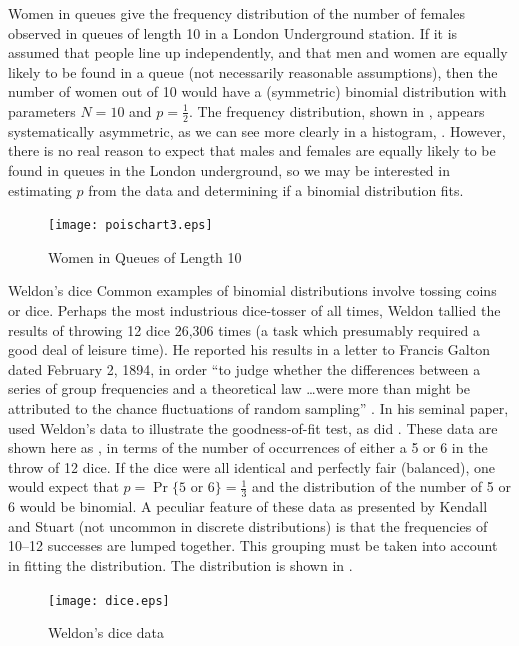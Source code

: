 \begin{Example}[queues]{Women in queues}
\citet{JinkinsonSlater:81,HoaglinTukey:85}
give the frequency distribution of the number of females observed in
queues of length 10 in a London Underground station.
If it is assumed that people line up independently, and that
men and women are equally likely to be found in a queue
(not necessarily reasonable assumptions),
then the number of women out of 10
would have a (symmetric) binomial distribution with parameters $N=10$ and
$p=\frac12$.
The frequency distribution, shown in ,
appears systematically asymmetric, as we can see more clearly in
a histogram, .
However, there is no real reason to expect that males and females are
equally likely to be found in queues in the London underground,
so we may be interested in estimating $p$ from the data
and determining if a binomial distribution fits.



\begin{figure}[htb]
  \centering
  \texttt{[image: poischart3.eps]}
  \caption{Women in Queues of Length 10}%
  \label{fig:poischart3}
\end{figure}
\end{Example}

\begin{Example}[dice]{Weldon's dice}
Common examples of binomial distributions involve tossing coins
or dice.
Perhaps the most industrious dice-tosser of all times,
Weldon tallied the results of throwing 12 dice 26,306 times
(a task which presumably required a good deal of leisure time).
He reported his results in a letter to Francis Galton dated
February 2, 1894, in order
``to judge whether the differences between a series of group frequencies
and a theoretical law \dots were more than might be attributed
to the chance fluctuations of random sampling''
\citep{KempKemp:91}.
In his seminal paper,
\citet{Pearson:00} used Weldon's data to illustrate the \chisq{} goodness-of-fit test, as did
\citet[Table 5.1, p. 121]{KendallStuart:63}.  These data are
shown here as
,
in terms of the number of occurrences of either a 5 or
6 in the throw of 12 dice.
If the dice were all identical and perfectly fair (balanced), one would
expect that $p = \Pr\{5 \textrm{ or } 6\} = \frac13$
and the distribution of the number of 5 or 6 would be binomial.
A peculiar feature of these data
as presented by Kendall and Stuart (not uncommon in discrete distributions)
is that the frequencies of 10--12 successes
are lumped together.  This grouping must be taken into account in fitting
the distribution.  The distribution is shown in .

\begin{figure}[htb]
  \centering
  \texttt{[image: dice.eps]}
  \caption{Weldon's dice data}%
  \label{fig:dice}
\end{figure}
\end{Example}

